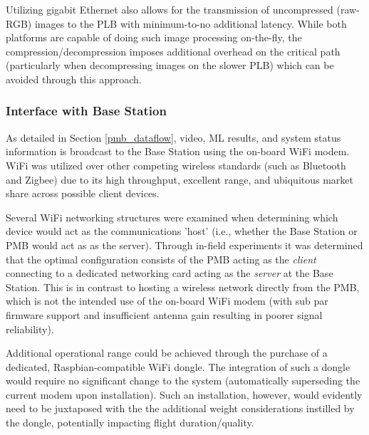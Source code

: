 Utilizing gigabit Ethernet also allows for the transmission of uncompressed (raw-RGB) images to the PLB with minimum-to-no additional latency. While both platforms are capable of doing such image processing on-the-fly, the compression/decompression imposes additional overhead on the critical path (particularly when decompressing images on the slower PLB) which can be avoided through this approach. 

\subsubsection{Interface with Base Station}

As detailed in Section \ref{pmb_dataflow}, video, ML results, and system status information is broadcast to the Base Station using the on-board WiFi modem. WiFi was utilized over other competing wireless standards (such as Bluetooth and Zigbee) due to its high throughput, excellent range, and ubiquitous market share across possible client devices.

Several WiFi networking structures were examined when determining which device would act as the communications 'host' (i.e., whether the Base Station or PMB would act as as the server). Through in-field experiments it was determined that the optimal configuration consists of the PMB acting as the \textit{client} connecting to a dedicated networking card acting as the \textit{server} at the Base Station. This is in contrast to hosting a wireless network directly from the PMB, which is not the intended use of the on-board WiFi modem (with sub par firmware support and insufficient antenna gain resulting in poorer signal reliability). 

Additional operational range could be achieved through the purchase of a dedicated, Raspbian-compatible WiFi dongle. The integration of such a dongle would require no significant change to the system (automatically superseding the current modem upon installation). Such an installation, however, would evidently need to be juxtaposed with the the additional weight considerations instilled by the dongle, potentially impacting flight duration/quality.